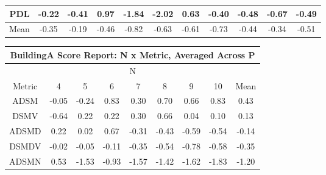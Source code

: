 \documentclass[11pt,a4paper]{report}
\begin{document}
\begin{longtable}{ | c || c | c | c | c | c | c | c | c | c || c |}
PDL &  \cellcolor[HTML]{FFF7F7} -0.22 &  \cellcolor[HTML]{FFF7F7} -0.41 &  \cellcolor[HTML]{E7E7FF} 0.97 &  \cellcolor[HTML]{FFCFCF} -1.84 &  \cellcolor[HTML]{FFCFCF} -2.02 &  \cellcolor[HTML]{EFEFFF} 0.63 &  \cellcolor[HTML]{FFF7F7} -0.40 &  \cellcolor[HTML]{FFEFEF} -0.48 &  \cellcolor[HTML]{FFEFEF} -0.67 &  \cellcolor[HTML]{FFEFEF} -0.49 \\
\hline
\hline
Mean  &  \cellcolor[HTML]{FFF7F7} -0.35 &  \cellcolor[HTML]{FFF7F7} -0.19 &  \cellcolor[HTML]{FFF7F7} -0.46 &  \cellcolor[HTML]{FFE7E7} -0.82 &  \cellcolor[HTML]{FFEFEF} -0.63 &  \cellcolor[HTML]{FFEFEF} -0.61 &  \cellcolor[HTML]{FFEFEF} -0.73 &  \cellcolor[HTML]{FFF7F7} -0.44 &  \cellcolor[HTML]{FFF7F7} -0.34 &  \cellcolor[HTML]{FFEFEF} -0.51 \\
\hline
\end{longtable}
\begin{longtable}{ | c || c | c | c | c | c | c | c || c |}
\hline
\multicolumn{9}{|c|}{ BuildingA Score Report: N x Metric, Averaged Across P } \\
\hline
\multicolumn{9}{|c|}{ N } \\
\hline
Metric & 4 & 5 & 6 & 7 & 8 & 9 & 10 & Mean\\
\hline
\hline
\endhead
ADSM &  \cellcolor[HTML]{FFFFFF} -0.05 &  \cellcolor[HTML]{FFF7F7} -0.24 &  \cellcolor[HTML]{E7E7FF} 0.83 &  \cellcolor[HTML]{F7F7FF} 0.30 &  \cellcolor[HTML]{EFEFFF} 0.70 &  \cellcolor[HTML]{EFEFFF} 0.66 &  \cellcolor[HTML]{E7E7FF} 0.83 &  \cellcolor[HTML]{F7F7FF} 0.43 \\
DSMV &  \cellcolor[HTML]{FFEFEF} -0.64 &  \cellcolor[HTML]{F7F7FF} 0.22 &  \cellcolor[HTML]{F7F7FF} 0.22 &  \cellcolor[HTML]{F7F7FF} 0.30 &  \cellcolor[HTML]{EFEFFF} 0.66 &  \cellcolor[HTML]{FFFFFF} 0.04 &  \cellcolor[HTML]{FFFFFF} 0.10 &  \cellcolor[HTML]{FFFFFF} 0.13 \\
ADSMD &  \cellcolor[HTML]{F7F7FF} 0.22 &  \cellcolor[HTML]{FFFFFF} 0.02 &  \cellcolor[HTML]{EFEFFF} 0.67 &  \cellcolor[HTML]{FFF7F7} -0.31 &  \cellcolor[HTML]{FFF7F7} -0.43 &  \cellcolor[HTML]{FFEFEF} -0.59 &  \cellcolor[HTML]{FFEFEF} -0.54 &  \cellcolor[HTML]{FFFFFF} -0.14 \\
DSMDV &  \cellcolor[HTML]{FFFFFF} -0.02 &  \cellcolor[HTML]{FFFFFF} -0.05 &  \cellcolor[HTML]{FFFFFF} -0.11 &  \cellcolor[HTML]{FFF7F7} -0.35 &  \cellcolor[HTML]{FFEFEF} -0.54 &  \cellcolor[HTML]{FFEFEF} -0.78 &  \cellcolor[HTML]{FFEFEF} -0.58 &  \cellcolor[HTML]{FFF7F7} -0.35 \\
ADSMN &  \cellcolor[HTML]{EFEFFF} 0.53 &  \cellcolor[HTML]{FFD7D7} -1.53 &  \cellcolor[HTML]{FFE7E7} -0.93 &  \cellcolor[HTML]{FFD7D7} -1.57 &  \cellcolor[HTML]{FFDFDF} -1.42 &  \cellcolor[HTML]{FFD7D7} -1.62 &  \cellcolor[HTML]{FFCFCF} -1.83 &  \cellcolor[HTML]{FFDFDF} -1.20 \\

\end{longtable}
\end{document}
